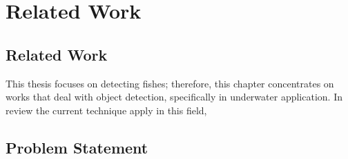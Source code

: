 \chapter{Related Work}
\label{chapter:Related Work}



 
\section{Related Work}
This thesis focuses on detecting fishes; therefore, this chapter concentrates on
works that deal with object detection, specifically in underwater application.
In \citet{Shortis2013} review the current technique apply in this field,



\section{Problem Statement}


